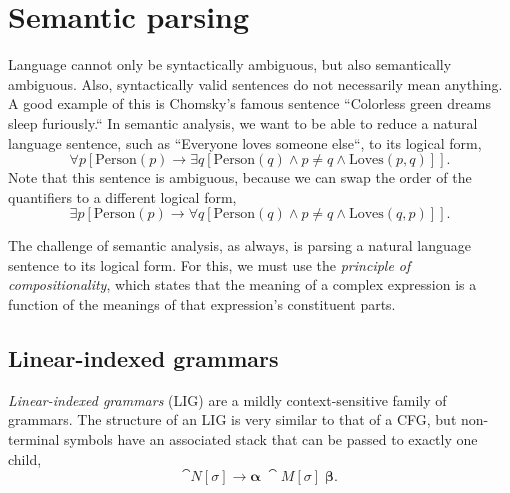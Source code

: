 \section{Semantic parsing} \label{sec:semantic_parsing}

Language cannot only be syntactically ambiguous, but also semantically
ambiguous. Also, syntactically valid sentences do not necessarily mean anything.
A good example of this is Chomsky's famous sentence ``Colorless green dreams
sleep furiously.`` In semantic analysis, we want to be able to reduce a natural
language sentence, such as ``Everyone loves someone else``, to its logical form,
\[
    \forall p [ \mathrm{Person}(p) \to \exists q [ \mathrm{Person}(q) \land p \neq
                    q \land \mathrm{Loves}(p, q) ]]
    .\]
Note that this sentence is ambiguous, because we can swap the order of the
quantifiers to a different logical form, \[
    \exists p [ \mathrm{Person}(p) \to \forall q [ \mathrm{Person}(q) \land p \neq
                    q \land \mathrm{Loves}(q, p) ]]
    .\]

The challenge of semantic analysis, as always, is parsing a natural language
sentence to its logical form. For this, we must use the \textit{principle of
    compositionality}, which states that the meaning of a complex expression is a
function of the meanings of that expression's constituent parts.

\subsection{Linear-indexed grammars}

\textit{Linear-indexed grammars} (LIG) \citep{aho1968indexed} are a mildly
context-sensitive family of grammars. The structure of an LIG is very similar
to that of a CFG, but non-terminal symbols have an associated stack that can be
passed to exactly one child, \[
    \cat{N}[\sigma] \to \bm{\alpha} \; \cat{M}[\sigma] \; \bm{\beta}
    .\]

